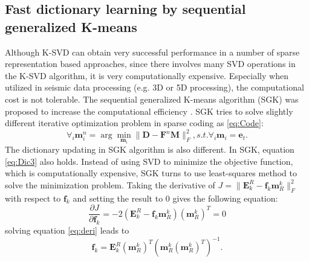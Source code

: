 \subsection{Fast dictionary learning by sequential generalized K-means}
Although K-SVD can obtain very successful performance in a number of sparse representation based approaches, since there involves many SVD operations in the K-SVD algorithm, it is very computationally expensive. Especially when utilized in  seismic data processing (e.g. 3D or 5D processing), the computational cost is not tolerable. The sequential generalized K-means algorithm (SGK) was proposed to increase the computational efficiency \cite[]{sgk2013}. SGK tries to solve slightly different iterative optimization problem in sparse coding as  \ref{eq:Code}:
\begin{equation}
\label{eq:Code2}
\forall_i \mathbf{m}_i ^n = \arg \min_{\mathbf{m}_i} \parallel \mathbf{D} - \mathbf{F}^n\mathbf{M} \parallel_F^2, s.t. \forall_i \mathbf{m}_i = \mathbf{e}_t.%
\end{equation}
The dictionary updating in SGK algorithm is also different. 
In SGK, equation \ref{eq:Dic3} also holds. Instead of using SVD to minimize the objective function, which is computationally expensive, SGK turns to use least-squares method to solve the minimization problem. Taking the derivative of $J=\parallel\mathbf{E}^R_k- \mathbf{f}_k\mathbf{m}_R^k \parallel_F^2$ with respect to $\mathbf{f}_k$ and setting the result to 0 gives the following equation:
\begin{equation}
\label{eq:deri}
\frac{\partial J}{\partial \mathbf{f}_k} = -2(\mathbf{E}^{R}_k-\mathbf{f}_k\mathbf{m}_R^k)(\mathbf{m}_R^k)^T = 0
\end{equation}
solving equation \ref{eq:deri} leads to
\begin{equation}
\label{eq:deriso}
\mathbf{f}_k = \mathbf{E}^R_k (\mathbf{m}_R^k)^T \left( \mathbf{m}_R^k (\mathbf{m}_R^k)^T \right)^{-1}.
\end{equation}

